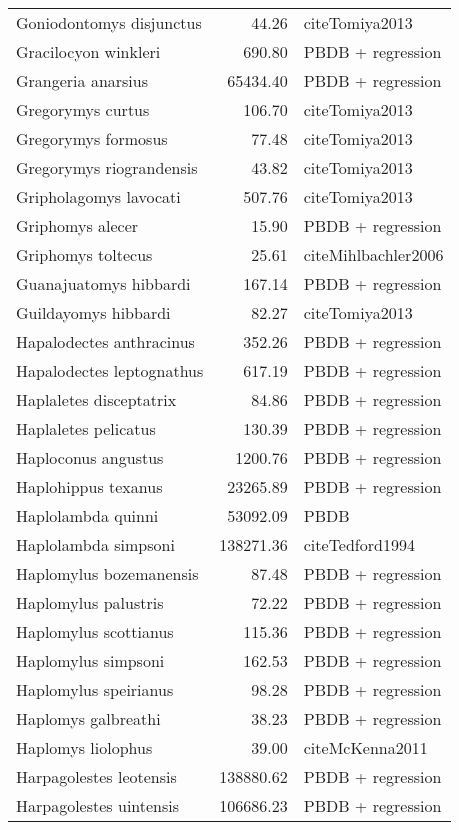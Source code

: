 \begin{table}[ht]
\begin{tabular}{lrl}
  Goniodontomys disjunctus & 44.26 & cite{Tomiya2013} \\ 
  Gracilocyon winkleri & 690.80 & PBDB + regression \\ 
  Grangeria anarsius & 65434.40 & PBDB + regression \\ 
  Gregorymys curtus & 106.70 & cite{Tomiya2013} \\ 
  Gregorymys formosus & 77.48 & cite{Tomiya2013} \\ 
  Gregorymys riograndensis & 43.82 & cite{Tomiya2013} \\ 
  Gripholagomys lavocati & 507.76 & cite{Tomiya2013} \\ 
  Griphomys alecer & 15.90 & PBDB + regression \\ 
  Griphomys toltecus & 25.61 & cite{Mihlbachler2006} \\ 
  Guanajuatomys hibbardi & 167.14 & PBDB + regression \\ 
  Guildayomys hibbardi & 82.27 & cite{Tomiya2013} \\ 
  Hapalodectes anthracinus & 352.26 & PBDB + regression \\ 
  Hapalodectes leptognathus & 617.19 & PBDB + regression \\ 
  Haplaletes disceptatrix & 84.86 & PBDB + regression \\ 
  Haplaletes pelicatus & 130.39 & PBDB + regression \\ 
  Haploconus angustus & 1200.76 & PBDB + regression \\ 
  Haplohippus texanus & 23265.89 & PBDB + regression \\ 
  Haplolambda quinni & 53092.09 & PBDB \\ 
  Haplolambda simpsoni & 138271.36 & cite{Tedford1994} \\ 
  Haplomylus bozemanensis & 87.48 & PBDB + regression \\ 
  Haplomylus palustris & 72.22 & PBDB + regression \\ 
  Haplomylus scottianus & 115.36 & PBDB + regression \\ 
  Haplomylus simpsoni & 162.53 & PBDB + regression \\ 
  Haplomylus speirianus & 98.28 & PBDB + regression \\ 
  Haplomys galbreathi & 38.23 & PBDB + regression \\ 
  Haplomys liolophus & 39.00 & cite{McKenna2011} \\ 
  Harpagolestes leotensis & 138880.62 & PBDB + regression \\ 
  Harpagolestes uintensis & 106686.23 & PBDB + regression \\ 

\end{tabular}
\end{table}

